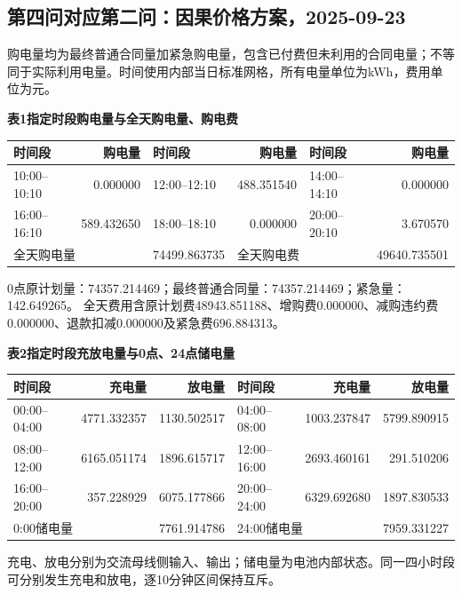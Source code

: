 \subsection{第四问对应第二问：因果价格方案，2025-09-23}
\begingroup\small
\setlength{\tabcolsep}{4pt}\renewcommand{\arraystretch}{1.08}
\setlength{\LTpre}{4pt}\setlength{\LTpost}{4pt}
\noindent 购电量均为最终普通合同量加紧急购电量，包含已付费但未利用的合同电量；不等同于实际利用电量。时间使用内部当日标准网格，所有电量单位为kWh，费用单位为元。
\begin{center}\textbf{表1\quad 指定时段购电量与全天购电量、购电费}\par\smallskip
\begin{tabular}{lr lr lr}\toprule
时间段 & 购电量 & 时间段 & 购电量 & 时间段 & 购电量\\\midrule
10:00--10:10 & 0.000000 & 12:00--12:10 & 488.351540 & 14:00--14:10 & 0.000000\\
16:00--16:10 & 589.432650 & 18:00--18:10 & 0.000000 & 20:00--20:10 & 3.670570\\
\midrule
\multicolumn{2}{l}{全天购电量} & 74499.863735 & \multicolumn{2}{l}{全天购电费} & 49640.735501\\
\bottomrule\end{tabular}\end{center}
\noindent 0点原计划量：74357.214469；最终普通合同量：74357.214469；紧急量：142.649265。
全天费用含原计划费48943.851188、增购费0.000000、减购违约费0.000000、退款扣减0.000000及紧急费696.884313。
\begin{center}\textbf{表2\quad 指定时段充放电量与0点、24点储电量}\par\smallskip
\begin{tabular}{lrr lrr}\toprule
时间段 & 充电量 & 放电量 & 时间段 & 充电量 & 放电量\\\midrule
00:00--04:00 & 4771.332357 & 1130.502517 & 04:00--08:00 & 1003.237847 & 5799.890915\\
08:00--12:00 & 6165.051174 & 1896.615717 & 12:00--16:00 & 2693.460161 & 291.510206\\
16:00--20:00 & 357.228929 & 6075.177866 & 20:00--24:00 & 6329.692680 & 1897.830533\\
\midrule
\multicolumn{2}{l}{0:00储电量} & 7761.914786 & \multicolumn{2}{l}{24:00储电量} & 7959.331227\\
\bottomrule\end{tabular}\end{center}
\noindent 充电、放电分别为交流母线侧输入、输出；储电量为电池内部状态。同一四小时段可分别发生充电和放电，逐10分钟区间保持互斥。
